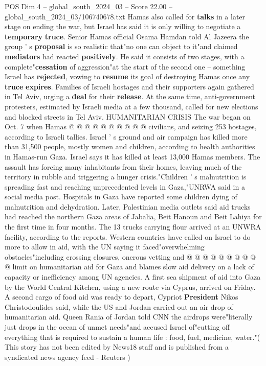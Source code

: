 \begin{textsample}{POS Dim 4 – global\_south\_2024\_03 – Score 22.00 – global\_south\_2024\_03/106740678.txt}
Hamas also called for \textbf{talks} in a later stage on ending the war, but Israel has said it is only willing to negotiate a \textbf{temporary} \textbf{truce}.
Senior Hamas official Osama Hamdan told Al Jazeera the group ' s \textbf{proposal} is so realistic that"no one can object to it"and claimed \textbf{mediators} had reacted \textbf{positively}.
He said it consists of two stages, with a complete"\textbf{cessation} of aggression"at the start of the second one -- something Israel has \textbf{rejected}, vowing to \textbf{resume} its goal of destroying Hamas once any \textbf{truce} \textbf{expires}.
Families of Israeli hostages and their supporters again gathered in Tel Aviv, urging a \textbf{deal} for their \textbf{release}.
At the same time, anti-government protesters, estimated by Israeli media at a few thousand, called for new elections and blocked streets in Tel Aviv.
HUMANITARIAN CRISIS The war began on Oct. 7 when Hamas @ @ @ @ @ @ @ @ @ @ civilians, and seizing 253 hostages, according to Israeli tallies.
Israel ' s ground and air campaign has killed more than 31,500 people, mostly women and children, according to health authorities in Hamas-run Gaza.
Israel says it has killed at least 13,000 Hamas members.
The assault has forcing many inhabitants from their homes, leaving much of the territory in rubble and triggering a hunger crisis."Children ' s malnutrition is spreading fast and reaching unprecedented levels in Gaza,"UNRWA said in a social media post.
Hospitals in Gaza have reported some children dying of malnutrition and dehydration.
Later, Palestinian media outlets said aid trucks had reached the northern Gaza areas of Jabalia, Beit Hanoun and Beit Lahiya for the first time in four months.
The 13 trucks carrying flour arrived at an UNWRA facility, according to the reports.
Western countries have called on Israel to do more to allow in aid, with the UN saying it faced"overwhelming obstacles"including crossing closures, onerous vetting and @ @ @ @ @ @ @ @ @ @ limit on humanitarian aid for Gaza and blames slow aid delivery on a lack of capacity or inefficiency among UN agencies.
A first sea shipment of aid into Gaza by the World Central Kitchen, using a new route via Cyprus, arrived on Friday.
A second cargo of food aid was ready to depart, Cypriot \textbf{President} Nikos Christodoulides said, while the US and Jordan carried out an air drop of humanitarian aid.
Queen Rania of Jordan told CNN the airdrops were"literally just drops in the ocean of unmet needs"and accused Israel of"cutting off everything that is required to sustain a human life : food, fuel, medicine, water."( This story has not been edited by News18 staff and is published from a syndicated news agency feed - Reuters )

\end{textsample}
